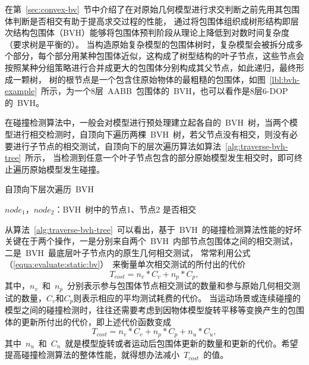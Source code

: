 在第~\ref{sec:convex-bv}~节中介绍了在对原始几何模型进行求交判断之前先用其包围体判断是否相交有助于提高求交过程的性能，
通过将包围体组织成树形结构即层次结构包围体（BVH）能够将包围体预判阶段从理论上降低到对数时间复杂度（要求树是平衡的）。
当构造原始复杂模型的包围体树时，复杂模型会被拆分成多个部分，每个部分用某种包围体近似，这构成了树型结构的叶子节点，这些节点会按照某种分组策略进行合并成更大的包围体分别构成其父节点，如此递归，最终形成一颗树，
树的根节点是一个包含住原始物体的最粗糙的包围体，如图~\ref{lbl:bvh-example}~所示，为一个8层~AABB~包围体的~BVH，也可以看作是8层6-DOP的~BVH。

在碰撞检测算法中，一般会对模型进行预处理建立起各自的~BVH~树，当两个模型进行相交检测时，自顶向下遍历两棵~BVH~树，若父节点没有相交，则没有必要进行子节点的相交测试，自顶向下的层次遍历算法如算法~\ref{alg:traverse-bvh-tree}~所示，
当检测到任意一个叶子节点包含的部分原始模型发生相交时，即可终止遍历原始模型发生碰撞。

\begin{algorithm}
\small
\caption{自顶向下层次遍历~BVH~}
\label{alg:traverse-bvh-tree}
\begin{algorithmic}[1]
\Require
$node_1$，$node_2$：BVH~树中的节点1、节点2
\Ensure
是否相交
    \State {} 
  \Else
               
           \Else
              \State {} 
              \EndFor
           \EndIf
      \Else
           \State {}  
           \EndFor
      \EndIf
  \EndIf
\EndFunction
\end{algorithmic}
\end{algorithm}
从算法~\ref{alg:traverse-bvh-tree}~可以看出，基于~BVH~的碰撞检测算法性能的好坏关键在于两个操作，一是分别来自两个~BVH~内部节点包围体之间的相交测试，二是~BVH~最底层叶子节点内的原生几何相交测试，
常常利用公式（\ref{equa:evaluate:static:bv}）~来衡量单次相交测试的所付出的代价
\begin{equation}
T_{cost} = n_v * C_v + n_p * C_p,
\label{equa:evaluate:static:bv}
\end{equation}
其中，$n_v$~和~$n_p$~分别表示参与包围体节点相交测试的数量和参与原始几何相交测试的数量，$C_v$和$C_p$则表示相应的平均测试耗费的代价\cite{klosowski1998efficient}。
当运动场景或连续碰撞的模型之间的碰撞检测时，往往还需要考虑到因物体模型旋转平移等变换产生的包围体的更新所付出的代价，即上述代价函数变成
\begin{equation}
T_{cost} = n_v * C_v + n_p * C_p + n_u * C_u,
  \label{equa:evaluate:dynamic:bv}
\end{equation}
其中~$n_u$~和~$C_n$~就是模型旋转或者运动后包围体更新的数量和更新的代价。希望提高碰撞检测算法的整体性能，就得想办法减小~$T_{cost}$~的值。

